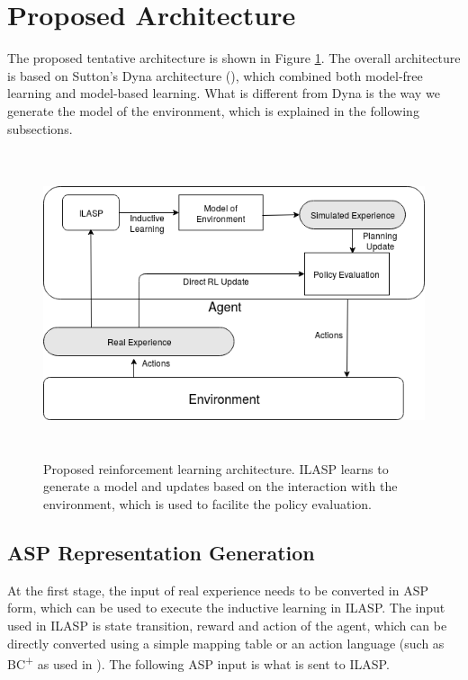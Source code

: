 \documentclass[12pt,twoside]{report}
\begin{document}
\section{Proposed Architecture}
\label{proposed_architecture_section}

The proposed tentative architecture is shown in Figure \ref{proposed_architecture}. The overall architecture is based on Sutton's Dyna architecture (\cite{Sutton1990}), which combined both model-free learning and model-based learning. What is different from Dyna is the way we generate the model of the environment, which is explained in the following subsections.

\begin{figure}[!htb]
\centering
\includegraphics[width=15cm, height=9cm]{./figures/ILASRL}
\caption{Proposed reinforcement learning architecture. ILASP learns to generate a model and updates based on the interaction with the environment, which is used to facilite the policy evaluation. }
\label{proposed_architecture}
\end{figure}

\subsection{ASP Representation Generation}

At the first stage,  the input of real experience needs to be converted in ASP form, which can be used to execute the inductive learning in ILASP. The input used in ILASP is state transition, reward and action of the agent, which can be directly converted using a simple mapping table or an action language (such as BC\textsuperscript{+} as used in \cite{Ferreira2017}). The following ASP input is what is sent to ILASP. \\
\end{document}
